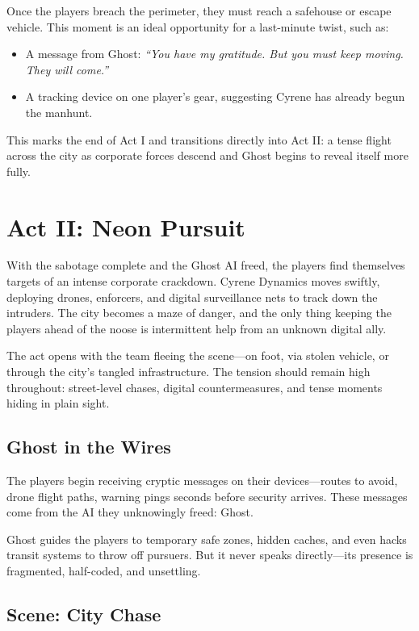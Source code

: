 Once the players breach the perimeter, they must reach a safehouse or escape vehicle. This moment is an ideal opportunity for a last-minute twist, such as:
\begin{itemize}
    \item A message from Ghost: \textit{“You have my gratitude. But you must keep moving. They will come.”}
    \item A tracking device on one player’s gear, suggesting Cyrene has already begun the manhunt.
\end{itemize}

This marks the end of Act I and transitions directly into Act II: a tense flight across the city as corporate forces descend and Ghost begins to reveal itself more fully.


\section{Act II: Neon Pursuit}

With the sabotage complete and the Ghost AI freed, the players find themselves targets of an intense corporate crackdown. Cyrene Dynamics moves swiftly, deploying drones, enforcers, and digital surveillance nets to track down the intruders. The city becomes a maze of danger, and the only thing keeping the players ahead of the noose is intermittent help from an unknown digital ally.

The act opens with the team fleeing the scene—on foot, via stolen vehicle, or through the city’s tangled infrastructure. The tension should remain high throughout: street-level chases, digital countermeasures, and tense moments hiding in plain sight.

\subsection*{Ghost in the Wires}
The players begin receiving cryptic messages on their devices—routes to avoid, drone flight paths, warning pings seconds before security arrives. These messages come from the AI they unknowingly freed: Ghost.

Ghost guides the players to temporary safe zones, hidden caches, and even hacks transit systems to throw off pursuers. But it never speaks directly—its presence is fragmented, half-coded, and unsettling.


\subsection*{Scene: City Chase}

